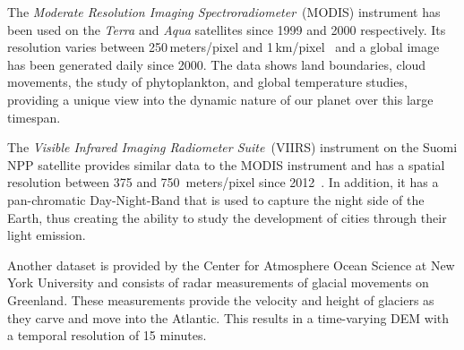 \documentclass[journal]{vgtc}                %
\begin{document}
The \emph{Moderate Resolution Imaging Spectroradiometer}~(MODIS) instrument has been used on the \emph{Terra} and \emph{Aqua} satellites since 1999 and 2000 respectively.
Its resolution varies between 250\,meters/pixel and 1\,km/pixel~\cite{salomonson1989modis, justice2002overview} and a global image has been generated daily since 2000.
The data shows land boundaries, cloud movements, the study of phytoplankton, and global temperature studies, providing a unique view into the dynamic nature of our planet over this large timespan.

The \emph{Visible Infrared Imaging Radiometer Suite}~(VIIRS) instrument on the Suomi NPP satellite provides similar data to the MODIS instrument and has a spatial resolution between 375 and 750 \,meters/pixel since 2012~\cite{schueler2002npoess}.
In addition, it has a pan-chromatic Day-Night-Band that is used to capture the night side of the Earth, thus creating the ability to study the development of cities through their light emission.

Another dataset is provided by the Center for Atmosphere Ocean Science at New York University and consists of radar measurements of glacial movements on Greenland. These measurements provide the velocity and height of glaciers as they carve and move into the Atlantic. This results in a time-varying DEM with a temporal resolution of 15 minutes.
\end{document}
